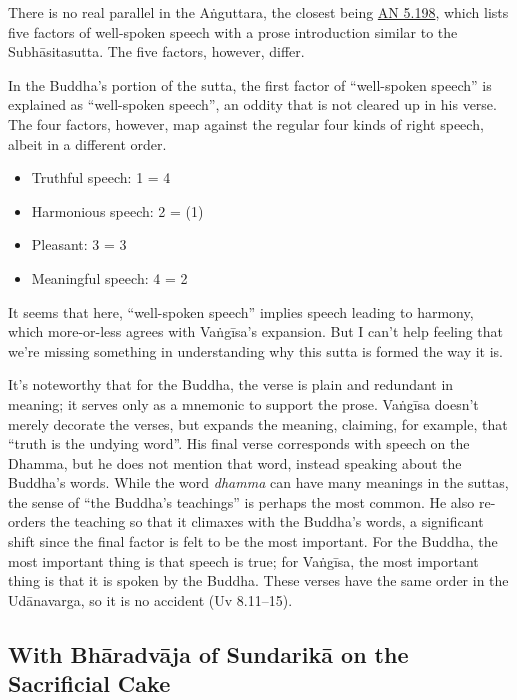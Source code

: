 \documentclass[12pt,openany]{book}%
\begin{document}
There is no real parallel in the \textsanskrit{Aṅguttara}, the closest being \href{https://suttacentral.net/an5.198/en/sujato}{AN 5.198}, which lists five factors of well-spoken speech with a prose introduction similar to the \textsanskrit{Subhāsitasutta}. The five factors, however, differ.

In the Buddha’s portion of the sutta, the first factor of “well-spoken speech” is explained as “well-spoken speech”, an oddity that is not cleared up in his verse. The four factors, however, map against the regular four kinds of right speech, albeit in a different order.

\begin{itemize}%
\item Truthful speech: 1 = 4%
\item Harmonious speech: 2 = (1)%
\item Pleasant: 3 = 3%
\item Meaningful speech: 4 = 2%
\end{itemize}

It seems that here, “well-spoken speech” implies speech leading to harmony, which more-or-less agrees with \textsanskrit{Vaṅgīsa}’s expansion. But I can’t help feeling that we’re missing something in understanding why this sutta is formed the way it is.

It’s noteworthy that for the Buddha, the verse is plain and redundant in meaning; it serves only as a mnemonic to support the prose. \textsanskrit{Vaṅgīsa} doesn’t merely decorate the verses, but expands the meaning, claiming, for example, that “truth is the undying word”. His final verse corresponds with speech on the Dhamma, but he does not mention that word, instead speaking about the Buddha’s words. While the word \textit{dhamma} can have many meanings in the suttas, the sense of “the Buddha’s teachings” is perhaps the most common. He also re-orders the teaching so that it climaxes with the Buddha’s words, a significant shift since the final factor is felt to be the most important. For the Buddha, the most important thing is that speech is true; for \textsanskrit{Vaṅgīsa}, the most important thing is that it is spoken by the Buddha. These verses have the same order in the \textsanskrit{Udānavarga}, so it is no accident (Uv 8.11–15).

\subsection*{With \textsanskrit{Bhāradvāja} of \textsanskrit{Sundarikā} on the Sacrificial Cake}
\end{document}
